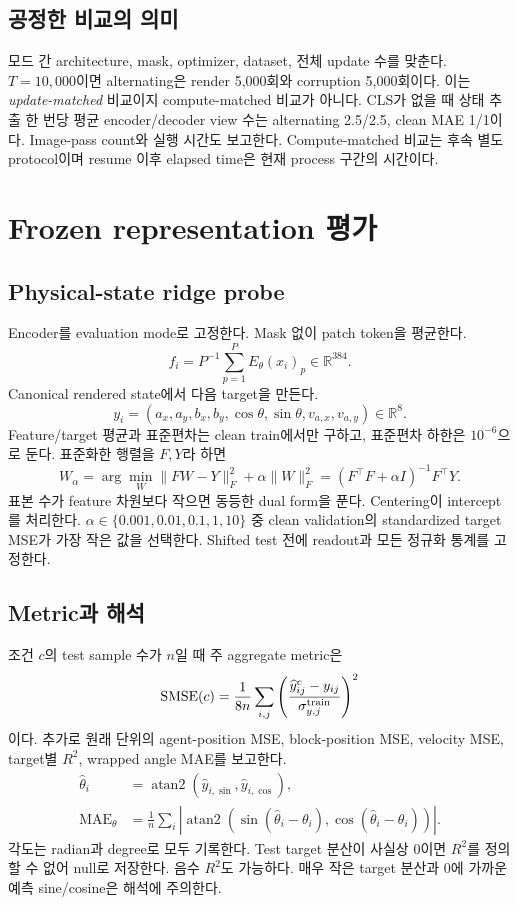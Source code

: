 \documentclass[11pt,a4paper]{article}
\newcommand{\R}{\mathbb{R}}
\begin{document}
\subsection{공정한 비교의 의미}
모드 간 architecture, mask, optimizer, dataset, 전체 update 수를 맞춘다.
$T=10{,}000$이면 alternating은 render 5,000회와 corruption 5,000회이다.
이는 \emph{update-matched} 비교이지 compute-matched 비교가 아니다.
CLS가 없을 때 상태 추출 한 번당 평균 encoder/decoder view 수는 alternating
2.5/2.5, clean MAE 1/1이다. Image-pass count와 실행 시간도 보고한다.
Compute-matched 비교는 후속 별도 protocol이며 resume 이후 elapsed time은
현재 process 구간의 시간이다.

\section{Frozen representation 평가}
\subsection{Physical-state ridge probe}
Encoder를 evaluation mode로 고정한다. Mask 없이 patch token을 평균한다.
\begin{equation}
f_i=P^{-1}\sum_{p=1}^{P}E_\theta(x_i)_p\in\R^{384}.
\end{equation}
Canonical rendered state에서 다음 target을 만든다.
\begin{equation}
y_i=(a_x,a_y,b_x,b_y,\cos\theta,\sin\theta,v_{a,x},v_{a,y})\in\R^8.
\end{equation}
Feature/target 평균과 표준편차는 clean train에서만 구하고, 표준편차 하한은
$10^{-6}$으로 둔다. 표준화한 행렬을 $F,Y$라 하면
\begin{equation}
W_\alpha=\arg\min_W\|FW-Y\|_F^2+\alpha\|W\|_F^2
=(F^\top F+\alpha I)^{-1}F^\top Y.
\end{equation}
표본 수가 feature 차원보다 작으면 동등한 dual form을 푼다. Centering이 intercept를
처리한다. $\alpha\in\{0.001,0.01,0.1,1,10\}$ 중 clean validation의 standardized
target MSE가 가장 작은 값을 선택한다. Shifted test 전에 readout과 모든 정규화
통계를 고정한다.

\subsection{Metric과 해석}
조건 $c$의 test sample 수가 $n$일 때 주 aggregate metric은
\begin{equation}
\operatorname{SMSE}(c)=\frac{1}{8n}\sum_{i,j}
\left(\frac{\widehat y_{ij}^{c}-y_{ij}}{\sigma^{\rm train}_{y,j}}\right)^2
\end{equation}
이다. 추가로 원래 단위의 agent-position MSE, block-position MSE, velocity MSE,
target별 $R^2$, wrapped angle MAE를 보고한다.
\begin{align}
\widehat\theta_i&=\operatorname{atan2}(\widehat y_{i,\sin},\widehat y_{i,\cos}),\\
\operatorname{MAE}_\theta&=\frac1n\sum_i\left|\operatorname{atan2}
(\sin(\widehat\theta_i-\theta_i),\cos(\widehat\theta_i-\theta_i))\right|.
\end{align}
각도는 radian과 degree로 모두 기록한다. Test target 분산이 사실상 0이면
$R^2$를 정의할 수 없어 null로 저장한다. 음수 $R^2$도 가능하다.
매우 작은 target 분산과 0에 가까운 예측 sine/cosine은 해석에 주의한다.
\end{document}
